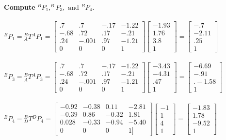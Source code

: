 \documentclass{article}
\begin{document}
\textbf{Compute} $^BP_1, ^BP_3, \text{ and } {} ^BP_4$.\\\\
$^BP_1={}^B_AT{}^AP_1=\begin{bmatrix}
.7 & .7 & -.17 & -1.22\\
-.68 & .72 & .17 & -.21\\
.24 & -.001 & .97 & -1.21\\
0 & 0 & 0 & 1
\end{bmatrix}\begin{bmatrix}
-1.93\\
1.76\\
3.8\\
1
\end{bmatrix}=\begin{bmatrix}
-.7\\
-2.11\\
.25\\
1
\end{bmatrix}$\\\\
$^BP_3={}^B_AT{}^AP_3=\begin{bmatrix}
.7 & .7 & -.17 & -1.22\\
-.68 & .72 & .17 & -.21\\
.24 & -.001 & .97 & -1.21\\
0 & 0 & 0 & 1
\end{bmatrix}\begin{bmatrix}
-3.43\\
-4.31\\
.47\\
1
\end{bmatrix}=\begin{bmatrix}
-6.69\\
-.91\\
.-1.58\\
1
\end{bmatrix}$\\\\
$^BP_4={}^B_DT{}^DP_4=\begin{bmatrix}
-0.92 & -0.38 & 0.11 & -2.81\\
-0.39 & 0.86 & -0.32 & 1.81\\
0.028 & -0.33 & -0.94 & -5.40\\
 0 & 0 & 0 & 1        ]
\end{bmatrix}\begin{bmatrix}
-1\\
1\\
4\\
1
\end{bmatrix}=\begin{bmatrix}
-1.83\\
1.78\\
-9.52\\
1
\end{bmatrix}$\\\\
\end{document}
